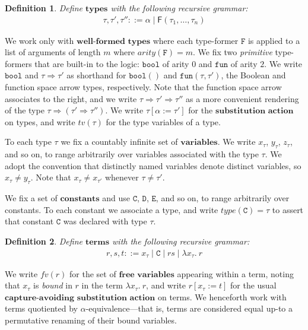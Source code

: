 \documentclass[a4paper, 10pt]{article}
\newtheorem{definition}{Definition}[section]
\newcommand{\deffont}[1]{\ensuremath{\textbf{#1}}}
\newcommand{\lam}[1]{\lambda{#1}.\ }
\begin{document}
\begin{definition}
\label{defn.types}
Define \deffont{types} with the following recursive grammar:
\begin{gather*}
\tau, \tau', \tau'' ::= \alpha \mid \mathsf{F}(\tau_1, \ldots, \tau_n)
\end{gather*}
\end{definition}

We work only with \deffont{well-formed types} where each type-former $\mathtt{F}$ is applied to a list of arguments of length $m$ where $arity(\mathtt{F}) = m$.
We fix two \emph{primitive} type-formers that are built-in to the logic: $\mathtt{bool}$ of arity $0$ and $\mathtt{fun}$ of arity $2$.
We write $\mathtt{bool}$ and $\tau \Rightarrow \tau'$ as shorthand for $\mathtt{bool}()$ and $\mathtt{fun}(\tau, \tau')$, the Boolean and function space arrow types, respectively.
Note that the function space arrow associates to the right, and we write $\tau \Rightarrow \tau' \Rightarrow \tau''$ as a more convenient rendering of the type $\tau \Rightarrow (\tau' \Rightarrow \tau'')$.
We write $\tau[\alpha := \tau']$ for the \deffont{substitution action} on types, and write $tv(\tau)$ for the type variables of a type.

To each type $\tau$ we fix a countably infinite set of \deffont{variables}.
We write $x_\tau$, $y_\tau$, $z_\tau$, and so on, to range arbitrarily over variables associated with the type $\tau$.
We adopt the convention that distinctly named variables denote distinct variables, so $x_\tau \neq y_\tau$.
Note that $x_\tau \neq x_{\tau'}$ whenever $\tau \neq \tau'$.

We fix a set of \deffont{constants} and use $\mathtt{C}$, $\mathtt{D}$, $\mathtt{E}$, and so on, to range arbitrarily over constants.
To each constant we associate a type, and write $type(\mathtt{C}) = \tau$ to assert that constant $\mathtt{C}$ was declared with type $\tau$.

\begin{definition}
\label{defn.terms}
Define \deffont{terms} with the following recursive grammar:
\begin{gather*}
r,s,t ::= x_\tau \mid \mathtt{C} \mid rs \mid \lam{x_\tau}r
\end{gather*}
\end{definition}

We write $fv(r)$ for the set of \deffont{free variables} appearing within a term, noting that $x_\tau$ is \emph{bound} in $r$ in the term $\lam{x_\tau}r$, and write $r[x_\tau := t]$ for the usual \deffont{capture-avoiding substitution action} on terms.
We henceforth work with terms quotiented by $\alpha$-equivalence---that is, terms are considered equal up-to a permutative renaming of their bound variables.
\end{document}
